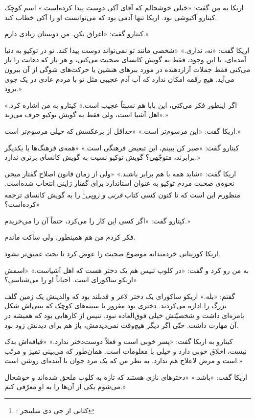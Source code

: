 \documentclass[a5paper]{book}
\begin{document}
اریکا به من گفت: «خیلی خوشحالم که آقای آکی‌ دوست پیدا کرده‌است.» اسم کوچک کیتارو آکیوشی بود. اریکا تنها آدمی بود که می‌توانست او را آکی خطاب کند.

کیتارو گفت: «اغراق نکن. من دوستان زیادی دارم.»

اریکا گفت: «نه، نداری.» «شخصی مانند تو نمی‌تواند دوست پیدا کند. تو در توکیو به دنیا آمده‌ای، با این وجود، فقط به گویش کانسای صحبت می‌کنی، و هر بار که دهانت را باز می‌کنی فقط جملات آزاردهنده در مورد ببرهای هنشین یا حرکت‌های شوگی از آن بیرون می‌آید. هیچ رقمه امکان ندارد که آب آدم عجیبی مثل تو با مردم عادی در یک جوی برود.»

«اگر اینطور فکر می‌کنی، این بابا هم نسبتاً عجیب است.» کیتارو به من اشاره کرد. «اهل آشیا است، ولی فقط به گویش توکیو حرف می‌زند.»

اریکا گفت: «این مرسوم‌تر است.» «حداقل از برعکسش که خیلی مرسوم‌تر است.»

کیتارو گفت: «صبر کن ببینم، این تبعیض فرهنگی است.» «همه‌ی فرهنگ‌ها با یکدیگر برابرند، متوجّهی؟ گویش توکیو نسیت به گویش کانسای برتری ندارد.»

اریکا گفت: «شاید همه با هم برابر باشند.» «ولی از زمان قانون اصلاح گفتار میجی نحوه‌ی صحبت مردم توکیو به عنوان استاندارد برای گفتار ژاپنی انتخاب شده‌است. منظورم این است که تا کنون کسی  کتاب \emph{فرنی و زویی}\footnote{
: کتابی از جی دی سلینجر}
را به گویش کانسای ترجمه کرده‌است؟»

کیتارو گفت: «اگر کسی این کار را می‌کرد، حتماً آن را می‌خریدم.»

فکر کردم من هم همینطور، ولی ساکت ماندم.

اریکا کوریتانی خردمندانه موضوع صحبت را عوض کرد تا بحث عمیق‌تر نشود.

به من رو کرد و گفت: «در کلوپ تنیس هم یک دختر هست که اهل آشیاست.» «اسمش اریکو ساکورای است. احیاناً او را می‌شناسی؟»

گفتم: «بله.» اریکو ساکورای یک دختر لاغر و قدبلند بود که والدینش یک زمین گلف بزرگ را اداره می‌کردند. دختری بود مغرور با سینه‌های کوچک که بینی‌اش شکل بامزه‌ای داشت و شخصیّتش خیلی فوق‌العاده نبود. تنیس از کارهایی بود که همیشه در آن مهارت داشت. حتّی اگر دیگر هیچ‌وقت نمی‌دیدمش، باز هم برای دیدنش زود بود.

کیتارو به اریکا گفت: «پسر خوبی است و فعلاً دوست‌دختر ندارد.» «قیافه‌اش بدک نیست، اخلاق خوبی دارد و خیلی با معلومات است. همان‌طور که می‌بینی تمیز و مرتّب است و مرض لاعلاج هم ندارد. به نظر من که یک مرد جوان با آینده‌‌ای روشن است.»

اریکا گفت: «باشد.» «دخترهای نازی هستند که تازه به کلوپ ملحق شده‌اند و خوشحال می‌شوم یکی از آن‌ها را به او معرّفی کنم.»
\end{document}
